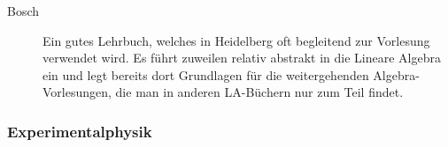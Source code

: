 \begin{description}
\item[Bosch]{
Ein gutes Lehrbuch, welches in Heidelberg oft begleitend zur Vorlesung
verwendet wird. Es führt zuweilen relativ abstrakt in die Lineare
Algebra ein und legt bereits dort Grundlagen für die weitergehenden
Algebra-Vorlesungen, die man in anderen LA-Büchern nur zum Teil findet.
}

\end{description}

\subsubsection{Experimentalphysik}
